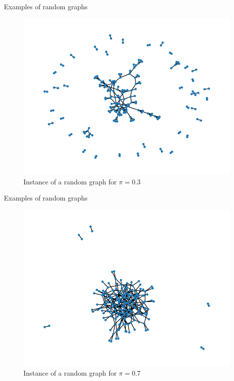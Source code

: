 \documentclass[handout]{beamer}
\begin{document}
\begin{frame}{Examples of random graphs}
    \begin{figure}
        \centering
        \includegraphics[height=.7\textheight]{rg1}
        \caption{Instance of a random graph for $\pi=0.3$}
        \label{fig:rg1}
    \end{figure}
\end{frame}

\begin{frame}{Examples of random graphs}
    \begin{figure}
        \centering
        \includegraphics[height=.7\textheight]{rg2}
        \caption{Instance of a random graph for $\pi=0.7$}
        \label{fig:rg2}
    \end{figure}
\end{frame}
\end{document}
